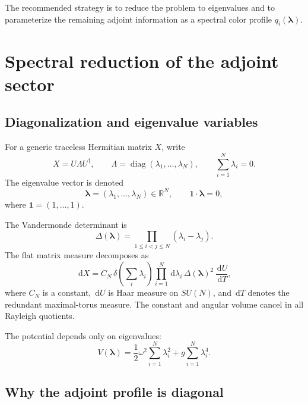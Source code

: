 \documentclass[11pt]{article}
\newcommand{\diag}{\operatorname{diag}}
\newcommand{\dd}{\,\mathrm d}
\newcommand{\R}{\mathbb R}
\begin{document}
The recommended strategy is to reduce the problem to eigenvalues and to parameterize the remaining adjoint information as a spectral color profile $q_i(\bm\lambda)$.

\section{Spectral reduction of the adjoint sector}

\subsection{Diagonalization and eigenvalue variables}

For a generic traceless Hermitian matrix $X$, write
\begin{equation}
X=U\Lambda U^\dagger,
\qquad
\Lambda=\diag(\lambda_1,\ldots,\lambda_N),
\qquad
\sum_{i=1}^N\lambda_i=0.
\end{equation}
The eigenvalue vector is denoted
\begin{equation}
\bm\lambda=(\lambda_1,\ldots,\lambda_N)\in \R^N,
\qquad
\bm 1\cdot\bm\lambda=0,
\end{equation}
where $\bm 1=(1,\ldots,1)$.

The Vandermonde determinant is
\begin{equation}
\Delta(\bm\lambda)=\prod_{1\leq i<j\leq N}(\lambda_i-\lambda_j).
\end{equation}
The flat matrix measure decomposes as
\begin{equation}
\dd X=C_N\,\delta\!\left(\sum_i\lambda_i\right)
\prod_{i=1}^N\dd\lambda_i\,\Delta(\bm\lambda)^2\,\frac{\dd U}{\dd T},
\end{equation}
where $C_N$ is a constant, $\dd U$ is Haar measure on $SU(N)$, and $\dd T$ denotes the redundant maximal-torus measure.  The constant and angular volume cancel in all Rayleigh quotients.

The potential depends only on eigenvalues:
\begin{equation}
\boxed{
V(\bm\lambda)=\frac12\omega^2\sum_{i=1}^N\lambda_i^2+g\sum_{i=1}^N\lambda_i^4.
}
\label{eq:eigenvalue_potential}
\end{equation}

\subsection{Why the adjoint profile is diagonal}
\end{document}
